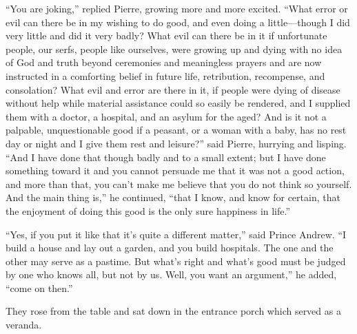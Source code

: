 ``You are joking,'' replied Pierre, growing more and more
excited. ``What error or evil can there be in my wishing to do
good, and even doing a little---though I did very little and did
it very badly? What evil can there be in it if unfortunate
people, our serfs, people like ourselves, were growing up and
dying with no idea of God and truth beyond ceremonies and
meaningless prayers and are now instructed in a comforting belief
in future life, retribution, recompense, and consolation? What
evil and error are there in it, if people were dying of disease
without help while material assistance could so easily be
rendered, and I supplied them with a doctor, a hospital, and an
asylum for the aged? And is it not a palpable, unquestionable
good if a peasant, or a woman with a baby, has no rest day or
night and I give them rest and leisure?'' said Pierre, hurrying
and lisping. ``And I have done that though badly and to a small
extent; but I have done something toward it and you cannot
persuade me that it was not a good action, and more than that,
you can't make me believe that you do not think so yourself. And
the main thing is,'' he continued, ``that I know, and know for
certain, that the enjoyment of doing this good is the only sure
happiness in life.''

``Yes, if you put it like that it's quite a different matter,''
said Prince Andrew. ``I build a house and lay out a garden, and
you build hospitals. The one and the other may serve as a
pastime. But what's right and what's good must be judged by one
who knows all, but not by us. Well, you want an argument,'' he
added, ``come on then.''

They rose from the table and sat down in the entrance porch which
served as a veranda.

